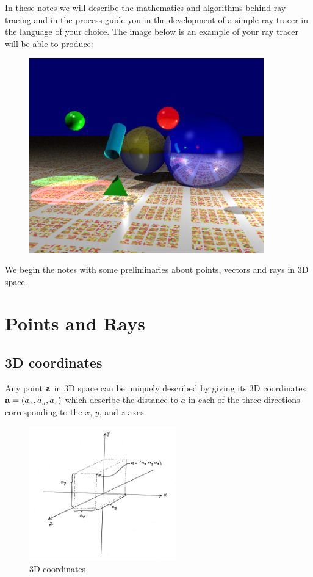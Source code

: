 \documentclass{book}
\newcommand{\vect}[1]{{\bf{ #1}}}
\begin{document}
In these notes we will describe the mathematics and algorithms behind ray tracing and in the process guide you in the development of a simple
ray tracer in the language of your choice. The image below is an example of your ray tracer will be able to produce:
\begin{figure}[h]
\centering
\includegraphics[width=4in]{images/cover.png}
\end{figure}

We begin the notes with some preliminaries about points, vectors and rays in 3D space.

\chapter{Points and Rays \label{chap:prelim}}

\section{3D coordinates}
Any point $\vect{a}$ in 3D space can be uniquely described by giving its 3D coordinates $\vect{a}=(a_x, a_y, a_z)$
which describe the distance to $a$ in each of the three directions corresponding to the $x$, $y$, and $z$ axes.

\begin{figure}[h]
\centering
\includegraphics[width=2.5in]{images/point3D.jpg}
\caption{3D coordinates}
\end{figure}
\end{document}
